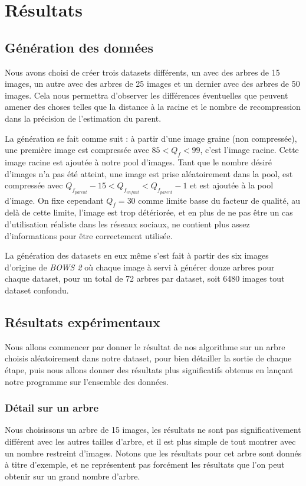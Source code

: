 \documentclass[utf8,final]{stageM2R} %
\begin{document}

\chapter{Résultats}
\label{chap4}

\section{Génération des données}
Nous avons choisi de créer trois datasets différents, un avec des arbres de 15 images, un autre avec des arbres de 25 images et un dernier avec des arbres de 50 images. Cela nous permettra d'observer les différences éventuelles que peuvent amener des choses telles que la distance à la racine et le nombre de recompression dans la précision de l'estimation du parent.

La génération se fait comme suit : à partir d'une image graine (non compressée), une première image est compressée avec $85 < Q_f < 99$, c'est l'image racine. Cette image racine est ajoutée à notre pool d'images. Tant que le nombre désiré d'images n'a pas été atteint, une image est prise aléatoirement dans la pool, est compressée avec $Q_{f_{parent}} - 15 < Q_{f_{enfant}} < Q_{f_{parent}} - 1$ et est ajoutée à la pool d'image. On fixe cependant $Q_f = 30$ comme limite basse du facteur de qualité, au delà de cette limite, l'image est trop détériorée, et en plus de ne pas être un cas d'utilisation réaliste dans les réseaux sociaux, ne contient plus assez d'informations pour être correctement utilisée.

La génération des datasets en eux même s'est fait à partir des six images d'origine de \textit{BOWS 2}\autocite{bows} où chaque image à servi à générer douze arbres pour chaque dataset, pour un total de 72 arbres par dataset, soit 6480 images tout dataset confondu.

\section{Résultats expérimentaux}

Nous allons commencer par donner le résultat de nos algorithme sur un arbre choisis aléatoirement dans notre dataset, pour bien détailler la sortie de chaque étape, puis nous allons donner des résultats plus significatifs obtenus en lançant notre programme sur l'ensemble des données.

\subsection{Détail sur un arbre}
Nous choisissons un arbre de 15 images, les résultats ne sont pas significativement différent avec les autres tailles d'arbre, et il est plus simple de tout montrer avec un nombre restreint d'images. Notons que les résultats pour cet arbre sont donnés à titre d'exemple, et ne représentent pas forcément les résultats que l'on peut obtenir sur un grand nombre d'arbre.
\end{document}
